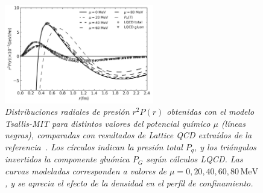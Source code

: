 \begin{figure}
    \centering
    \includegraphics[width=0.58\textwidth]{./Images/MIT-BagModel.png}
    \caption[Presión radial comparada con LQCD]{\emph{Distribuciones radiales de presión \( r^2 P(r) \) obtenidas con el modelo Tsallis-MIT para distintos valores del potencial químico \( \mu \) (líneas negras), comparadas con resultados de Lattice QCD extraídos de la referencia~\cite{shanahanPressureDistributionShear2019}. Los círculos indican la presión total \( P_q \), y los triángulos invertidos la componente gluónica \( P_G \) según cálculos LQCD. Las curvas modeladas corresponden a valores de \( \mu = 0, 20, 40, 60, 80 \,\mathrm{MeV} \), y se aprecia el efecto de la densidad en el perfil de confinamiento.}}
    \label{fig: Results}
\end{figure}